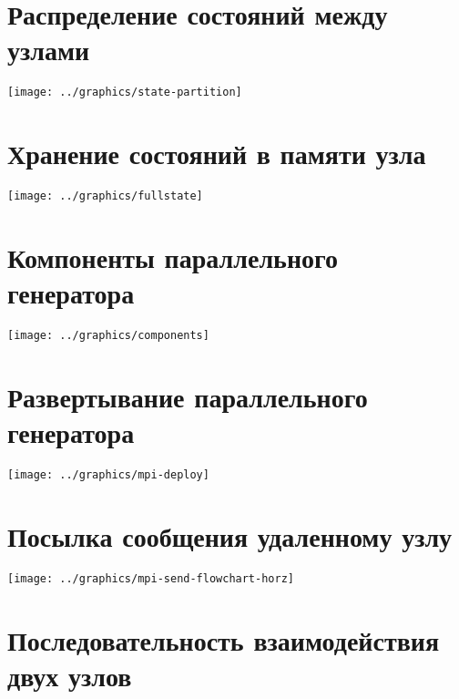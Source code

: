 \documentclass[12pt]{article}
\begin{document}
\section{Распределение состояний между узлами}
\label{sec:state-partitioning}

\begin{center}
  \texttt{[image: ../graphics/state-partition]}
\end{center}

\section{Хранение состояний в памяти узла}
\label{sec:state-store-full}

\begin{center}
  \texttt{[image: ../graphics/fullstate]}
\end{center}

\section{Компоненты параллельного генератора}
\label{sec:component-diag}

\begin{center}
  \texttt{[image: ../graphics/components]}
\end{center}

\section{Развертывание параллельного генератора}
\label{sec:deployment-diag}

\begin{center}
    \texttt{[image: ../graphics/mpi-deploy]}
\end{center}

\section{Посылка сообщения удаленному узлу}
\label{sec:mpi-send-flowchart}

\begin{center}
  \texttt{[image: ../graphics/mpi-send-flowchart-horz]}
\end{center}

\section{Последовательность взаимодействия двух узлов}
\label{sec:mpi-sequence}
\end{document}
